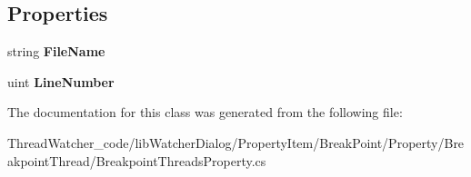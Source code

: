 \subsection*{Properties}
\begin{DoxyCompactItemize}
\item 
\hypertarget{classlib_watcher_dialog_1_1_property_item_1_1_break_point_1_1_property_1_1_breakpoint_threads_property_ab7788b41aa4ef5c36bc773538a8d006b}{string {\bfseries File\+Name}}\label{classlib_watcher_dialog_1_1_property_item_1_1_break_point_1_1_property_1_1_breakpoint_threads_property_ab7788b41aa4ef5c36bc773538a8d006b}

\item 
\hypertarget{classlib_watcher_dialog_1_1_property_item_1_1_break_point_1_1_property_1_1_breakpoint_threads_property_adc2edca2bf04bbdfaa9f08e3e61ee430}{uint {\bfseries Line\+Number}}\label{classlib_watcher_dialog_1_1_property_item_1_1_break_point_1_1_property_1_1_breakpoint_threads_property_adc2edca2bf04bbdfaa9f08e3e61ee430}

\end{DoxyCompactItemize}


The documentation for this class was generated from the following file\+:\begin{DoxyCompactItemize}
\item 
Thread\+Watcher\+\_\+code/lib\+Watcher\+Dialog/\+Property\+Item/\+Break\+Point/\+Property/\+Breakpoint\+Thread/Breakpoint\+Threads\+Property.\+cs\end{DoxyCompactItemize}
